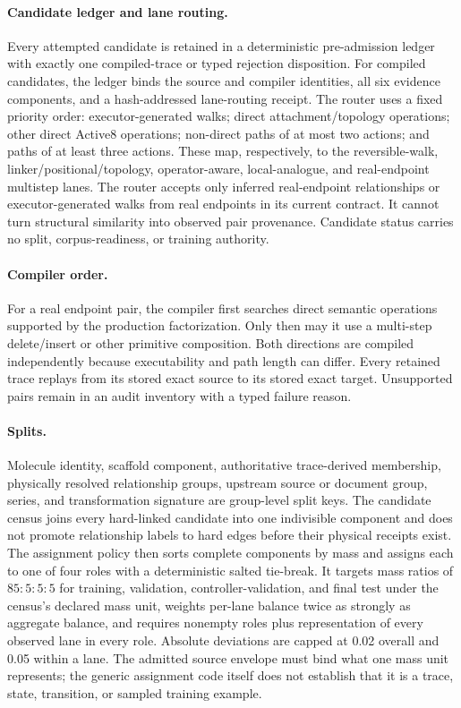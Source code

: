 \paragraph{Candidate ledger and lane routing.}
Every attempted candidate is retained in a deterministic pre-admission ledger
with exactly one compiled-trace or typed rejection disposition. For compiled
candidates, the ledger binds the source and compiler identities, all six
evidence components, and a hash-addressed lane-routing receipt. The router
uses a fixed priority order: executor-generated walks; direct
attachment/topology operations; other direct Active8 operations; non-direct
paths of at most two actions; and paths of at least three actions. These map,
respectively, to the reversible-walk, linker/positional/topology,
operator-aware, local-analogue, and real-endpoint multistep lanes. The router
accepts only inferred real-endpoint relationships or executor-generated walks
from real endpoints in its current contract. It cannot turn structural
similarity into observed pair provenance. Candidate status carries no split,
corpus-readiness, or training authority.

\paragraph{Compiler order.}
For a real endpoint pair, the compiler first searches direct semantic
operations supported by the production factorization.  Only then may it use a
multi-step delete/insert or other primitive composition.  Both directions are
compiled independently because executability and path length can differ.
Every retained trace replays from its stored exact source to its stored exact
target.  Unsupported pairs remain in an audit inventory with a typed failure
reason.

\paragraph{Splits.}
Molecule identity, scaffold component, authoritative trace-derived membership,
physically resolved relationship groups, upstream source or document group,
series, and transformation signature are group-level split keys. The
candidate census joins every hard-linked candidate into one indivisible
component and does not promote relationship labels to hard edges before their
physical receipts exist. The assignment policy then sorts complete components
by mass and assigns each to one of four roles with a deterministic salted
tie-break. It targets mass ratios of $85{:}5{:}5{:}5$ for training,
validation, controller-validation, and final test under the census's declared
mass unit, weights per-lane balance twice as strongly as aggregate balance,
and requires nonempty roles plus representation of every observed lane in
every role. Absolute deviations are capped at 0.02 overall and 0.05 within a
lane. The admitted source envelope must bind what one mass unit represents;
the generic assignment code itself does not establish that it is a trace,
state, transition, or sampled training example.

